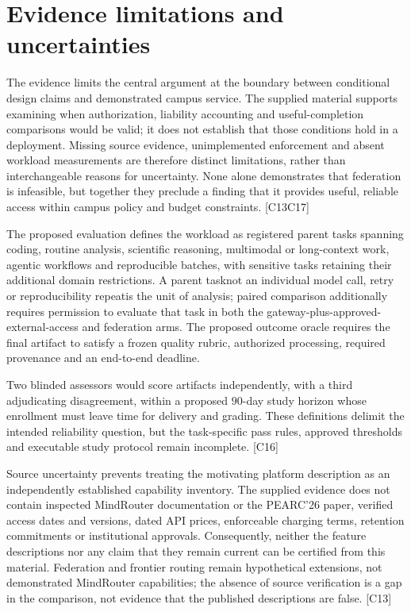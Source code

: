 \documentclass[11pt]{article}
\begin{document}
\section{Evidence limitations and uncertainties}
The evidence limits the central argument at the boundary between conditional design claims and demonstrated campus service. The supplied material supports examining when authorization, liability accounting and useful-completion comparisons would be valid; it does not establish that those conditions hold in a deployment. Missing source evidence, unimplemented enforcement and absent workload measurements are therefore distinct limitations, rather than interchangeable reasons for uncertainty. None alone demonstrates that federation is infeasible, but together they preclude a finding that it provides useful, reliable access within campus policy and budget constraints. [C13\textendash{}C17]

The proposed evaluation defines the workload as registered parent tasks spanning coding, routine analysis, scientific reasoning, multimodal or long-context work, agentic workflows and reproducible batches, with sensitive tasks retaining their additional domain restrictions. A parent task\textemdash{}not an individual model call, retry or reproducibility repeat\textemdash{}is the unit of analysis; paired comparison additionally requires permission to evaluate that task in both the gateway-plus-approved-external-access and federation arms. The proposed outcome oracle requires the final artifact to satisfy a frozen quality rubric, authorized processing, required provenance and an end-to-end deadline.

Two blinded assessors would score artifacts independently, with a third adjudicating disagreement, within a proposed $90$-day study horizon whose enrollment must leave time for delivery and grading. These definitions delimit the intended reliability question, but the task-specific pass rules, approved thresholds and executable study protocol remain incomplete. [C16]

Source uncertainty prevents treating the motivating platform description as an independently established capability inventory. The supplied evidence does not contain inspected MindRouter documentation or the PEARC\textquoteright{}26 paper, verified access dates and versions, dated API prices, enforceable charging terms, retention commitments or institutional approvals. Consequently, neither the feature descriptions nor any claim that they remain current can be certified from this material. Federation and frontier routing remain hypothetical extensions, not demonstrated MindRouter capabilities; the absence of source verification is a gap in the comparison, not evidence that the published descriptions are false. [C13]
\end{document}
